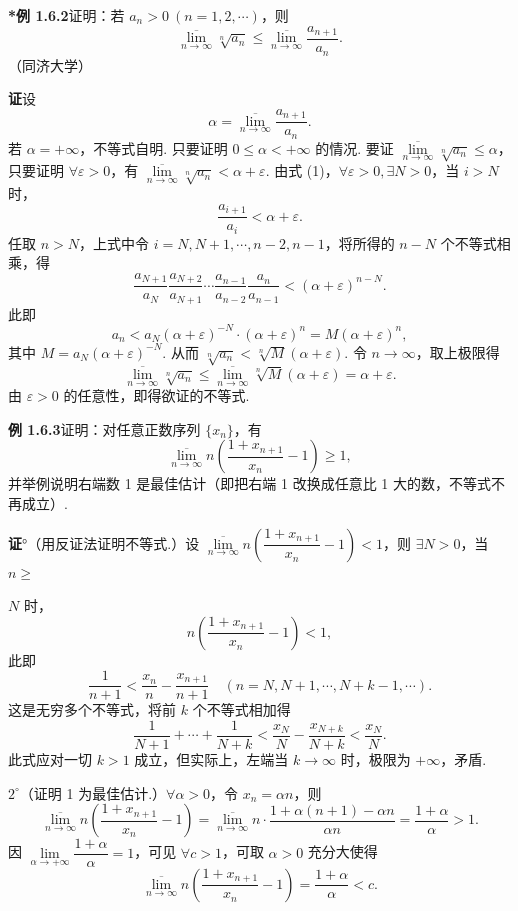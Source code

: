 \documentclass[UTF8, 12pt, fontset=fandol, oneside]{ctexart}
\begin{document}
\noindent\textbf{*例 1.6.2}\quad 证明：若 $a_n>0\ (n=1,2,\cdots)$，则
\[
  \overline{\lim_{n\to\infty}}\sqrt[n]{a_n}\le \overline{\lim_{n\to\infty}}\frac{a_{n+1}}{a_n}.
\]
（同济大学）

\noindent\textbf{证}\quad 设
\[
  \alpha=\overline{\lim_{n\to\infty}}\frac{a_{n+1}}{a_n}.
\tag{1}
\]
若 $\alpha=+\infty$，不等式自明. 只要证明 $0\le\alpha<+\infty$ 的情况. 要证 $\overline{\lim\limits_{n\to\infty}}\sqrt[n]{a_n}\le \alpha$，只要证明 $\forall \varepsilon>0$，有 $\overline{\lim\limits_{n\to\infty}}\sqrt[n]{a_n}<\alpha+\varepsilon$. 由式 (1)，$\forall \varepsilon>0,\exists N>0$，当 $i>N$ 时，
\[
  \frac{a_{i+1}}{a_i}<\alpha+\varepsilon.
\tag{2}
\]
任取 $n>N$，上式中令 $i=N,N+1,\cdots,n-2,n-1$，将所得的 $n-N$ 个不等式相乘，得
\[
  \frac{a_{N+1}}{a_N}\frac{a_{N+2}}{a_{N+1}}\cdots \frac{a_{n-1}}{a_{n-2}}\frac{a_n}{a_{n-1}}<(\alpha+\varepsilon)^{n-N}.
\]
此即
\[
  a_n<a_N(\alpha+\varepsilon)^{-N}\cdot(\alpha+\varepsilon)^n=M(\alpha+\varepsilon)^n,
\]
其中 $M=a_N(\alpha+\varepsilon)^{-N}$. 从而 $\sqrt[n]{a_n}<\sqrt[n]{M}(\alpha+\varepsilon)$. 令 $n\to\infty$，取上极限得
\[
  \overline{\lim_{n\to\infty}}\sqrt[n]{a_n}\le \overline{\lim_{n\to\infty}}\sqrt[n]{M}(\alpha+\varepsilon)=\alpha+\varepsilon.
\]
由 $\varepsilon>0$ 的任意性，即得欲证的不等式.

\noindent\textbf{例 1.6.3}\quad 证明：对任意正数序列 $\{x_n\}$，有
\[
  \overline{\lim_{n\to\infty}}n\left(\frac{1+x_{n+1}}{x_n}-1\right)\ge 1,
\]
并举例说明右端数 1 是最佳估计（即把右端 1 改换成任意比 1 大的数，不等式不再成立）.

\noindent\textbf{证}°（用反证法证明不等式.）设 $\overline{\lim\limits_{n\to\infty}}n\left(\dfrac{1+x_{n+1}}{x_n}-1\right)<1$，则 $\exists N>0$，当 $n\ge$

$N$ 时，
\[
  n\left(\frac{1+x_{n+1}}{x_n}-1\right)<1,
\]
此即
\[
  \frac1{n+1}<\frac{x_n}{n}-\frac{x_{n+1}}{n+1}\quad (n=N,N+1,\cdots,N+k-1,\cdots).
\]
这是无穷多个不等式，将前 $k$ 个不等式相加得
\[
  \frac1{N+1}+\cdots+\frac1{N+k}
  <\frac{x_N}{N}-\frac{x_{N+k}}{N+k}<\frac{x_N}{N}.
\]
此式应对一切 $k>1$ 成立，但实际上，左端当 $k\to\infty$ 时，极限为 $+\infty$，矛盾.

$2^\circ$（证明 1 为最佳估计.）$\forall \alpha>0$，令 $x_n=\alpha n$，则
\[
  \overline{\lim_{n\to\infty}}n\left(\frac{1+x_{n+1}}{x_n}-1\right)
  =\overline{\lim_{n\to\infty}}n\cdot\frac{1+\alpha(n+1)-\alpha n}{\alpha n}
  =\frac{1+\alpha}{\alpha}>1.
\]
因 $\lim\limits_{\alpha\to+\infty}\dfrac{1+\alpha}{\alpha}=1$，可见 $\forall c>1$，可取 $\alpha>0$ 充分大使得
\[
  \overline{\lim_{n\to\infty}}n\left(\frac{1+x_{n+1}}{x_n}-1\right)
  =\frac{1+\alpha}{\alpha}<c.
\]
\end{document}
